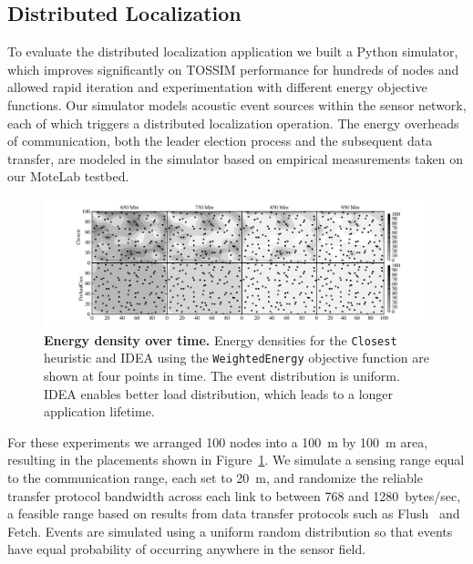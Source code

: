 \subsection{Distributed Localization}

To evaluate the distributed localization application we built a Python
simulator, which improves significantly on TOSSIM performance for hundreds of
nodes and allowed rapid iteration and experimentation with different energy
objective functions. Our simulator models acoustic event sources within the
sensor network, each of which triggers a distributed localization operation.
The energy overheads of communication, both the leader election process and
the subsequent data transfer, are modeled in the simulator based on empirical
measurements taken on our MoteLab testbed.

\begin{figure}[t]
\begin{center}
\includegraphics[width=\hsize]{./5-idea/figs/localizationdensityvtime.pdf}
\end{center}

\caption{\textbf{Energy density over time.} Energy densities for the
\texttt{Closest} heuristic and IDEA using the \texttt{WeightedEnergy}
objective function are shown at four points in time. The event distribution
is uniform. IDEA enables better load distribution, which leads to a longer
application lifetime.}

\label{idea-fig-localizationdensityvtime}
\end{figure}

For these experiments we arranged 100 nodes into a 100~m by 100~m area,
resulting in the placements shown in
Figure~\ref{idea-fig-localizationdensityvtime}. We simulate a sensing range
equal to the communication range, each set to 20~m, and randomize the
reliable transfer protocol bandwidth across each link to between 768 and
1280~bytes/sec, a feasible range based on results from data transfer
protocols such as Flush~\cite{flush-sensys07} and Fetch. Events are simulated
using a uniform random distribution so that events have equal probability of
occurring anywhere in the sensor field.

